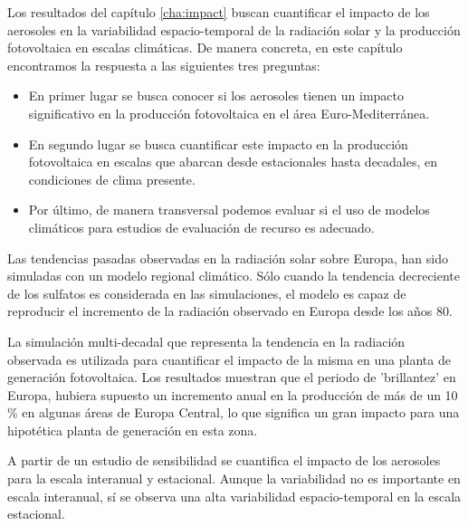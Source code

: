 Los resultados del capítulo \ref{cha:impact} buscan cuantificar el impacto de los aerosoles en la variabilidad espacio-temporal de la radiación solar y la producción fotovoltaica en escalas climáticas. De manera concreta, en este capítulo encontramos la respuesta a las siguientes tres preguntas:

\begin{itemize}
\item En primer lugar se busca conocer si los aerosoles tienen un impacto significativo en la producción fotovoltaica en el área Euro-Mediterránea.
\item En segundo lugar se busca cuantificar este impacto en la producción fotovoltaica en escalas que abarcan desde estacionales hasta decadales, en condiciones de clima presente.
\item Por último, de manera transversal podemos evaluar si el uso de modelos climáticos para estudios de evaluación de recurso es adecuado.
\end{itemize}

Las tendencias pasadas observadas en la radiación solar sobre Europa, han sido simuladas con un modelo regional climático. Sólo cuando la tendencia decreciente de los sulfatos es considerada en las simulaciones, el modelo es capaz de reproducir el incremento de la radiación observado en Europa desde los años 80.

La simulación multi-decadal que representa la tendencia en la radiación observada es utilizada para cuantificar el impacto de la misma en una planta de generación fotovoltaica. Los resultados muestran que el periodo de 'brillantez' en Europa, hubiera supuesto un incremento anual en la producción de más de un 10$\%$ en algunas áreas de Europa Central, lo que significa un gran impacto para una hipotética planta de generación en esta zona.

A partir de un estudio de sensibilidad se cuantifica el impacto de los aerosoles para la escala interanual y estacional. Aunque la variabilidad no es importante en escala interanual, sí se observa una alta variabilidad espacio-temporal en la escala estacional. 


